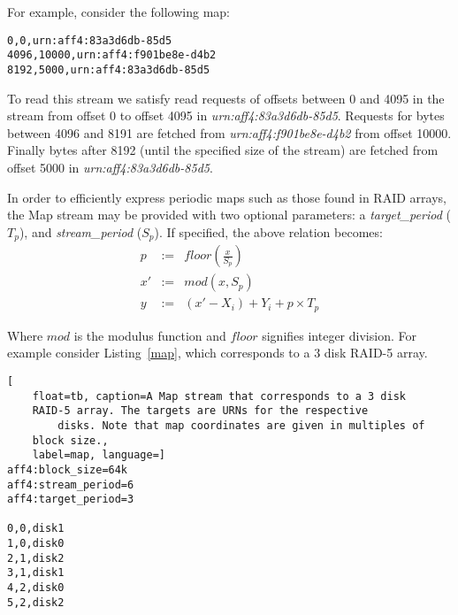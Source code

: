 \documentclass[10pt, conference]{IEEEtran}
\begin{document}
For example, consider the following map:
\begin{lstlisting}
0,0,urn:aff4:83a3d6db-85d5
4096,10000,urn:aff4:f901be8e-d4b2
8192,5000,urn:aff4:83a3d6db-85d5
\end{lstlisting}

To read this stream we satisfy read requests of offsets between 0 and
4095 in the stream from offset 0 to offset 4095 in
\emph{urn:aff4:83a3d6db-85d5}. Requests for bytes between 4096 and 8191 are
fetched from \emph{urn:aff4:f901be8e-d4b2} from offset 10000. Finally
bytes after 8192 (until the specified size of the stream) are fetched
from offset 5000 in \emph{urn:aff4:83a3d6db-85d5}.

In order to efficiently express periodic maps such as those found in
RAID arrays, the Map stream may be provided with two optional
parameters: a {\em target\_period} ($T_p$), and {\em stream\_period}
($S_p$). If specified, the above relation becomes:
\begin{eqnarray*}
p &:=& floor\left (\frac{x}{S_p} \right) \\
x' &:=& mod(x ,S_p)  \\   \label{eq:no1}
y &:=& (x'-X_i) + Y_i + p \times T_p
\end{eqnarray*}

Where $mod$ is the modulus function and $floor$ signifies integer
division. For example consider Listing~\ref{map}, which corresponds to a 3
disk RAID-5 array.

\begin{lstlisting}[
	float=tb, caption=A Map stream that corresponds to a 3 disk
	RAID-5 array. The targets are URNs for the respective
        disks. Note that map coordinates are given in multiples of 
	block size.,
	label=map, language=]
aff4:block_size=64k 
aff4:stream_period=6 
aff4:target_period=3

0,0,disk1
1,0,disk0
2,1,disk2
3,1,disk1
4,2,disk0
5,2,disk2
\end{lstlisting}


\end{document}
